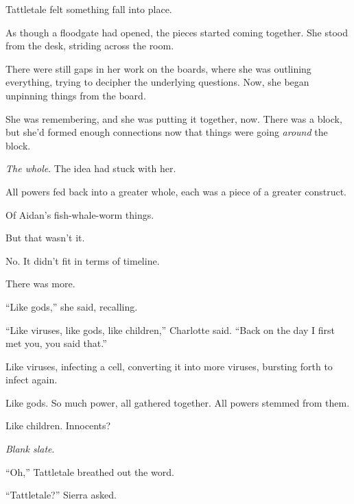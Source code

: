 Tattletale felt something fall into place.



As though a floodgate had opened, the pieces started coming together.  She stood from the desk, striding across the room.



There were still gaps in her work on the boards, where she was outlining everything, trying to decipher the underlying questions.  Now, she began unpinning things from the board.



She was remembering, and she was putting it together, now.  There was a block, but she'd formed enough connections now that things were going \emph{around} the block.



\emph{The whole}.  The idea had stuck with her.



All powers fed back into a greater whole, each was a piece of a greater construct.



Of Aidan's fish-whale-worm things.



But that wasn't it.



No.  It didn't fit in terms of timeline.



There was more.



``Like gods,'' she said, recalling.



``Like viruses, like gods, like children,'' Charlotte said.  ``Back on the day I first met you, you said that.''



Like viruses, infecting a cell, converting it into more viruses, bursting forth to infect again.



Like gods.  So much power, all gathered together.  All powers stemmed from them.



Like children.  Innocents?



\emph{Blank slate}.



``Oh,'' Tattletale breathed out the word.



``Tattletale?'' Sierra asked.



